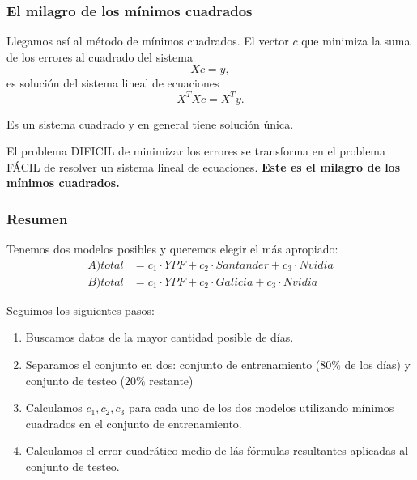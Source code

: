 \documentclass[aspectratio=169,12pt]{beamer}
\begin{document}

\begin{frame}
\frametitle{El milagro de los mínimos cuadrados}

Llegamos así al método de mínimos cuadrados. El vector $c$ que  minimiza la suma de los errores al cuadrado del sistema
$$ X c = y,$$
es solución del sistema lineal de ecuaciones
$$ X^T X c = X^T y.$$

Es un sistema cuadrado y en general tiene solución única. 

El problema DIFICIL de minimizar los errores se transforma en el problema FÁCIL de resolver un sistema lineal de ecuaciones. \textbf{Este es el milagro de los mínimos cuadrados.}

\end{frame}


\begin{frame}
\frametitle{Resumen}

Tenemos dos modelos posibles y queremos elegir el más apropiado:
\begin{align*}
A) total &= c_1 \cdot YPF + c_2 \cdot Santander + c_3 \cdot Nvidia \\
B) total &= c_1 \cdot YPF + c_2 \cdot Galicia + c_3 \cdot Nvidia
\end{align*}

Seguimos los siguientes pasos:
\begin{enumerate}
\item Buscamos datos de la mayor cantidad posible de días.
\item Separamos el conjunto en dos: conjunto de entrenamiento ($80\%$ de los días) y conjunto de testeo ($20\%$ restante)
\item Calculamos $c_1, c_2, c_3$ para cada uno de los dos modelos utilizando mínimos cuadrados en el conjunto de entrenamiento.
\item Calculamos el error cuadrático medio de lás fórmulas resultantes aplicadas al conjunto de testeo.
\end{enumerate}

\end{frame}

\end{document}
